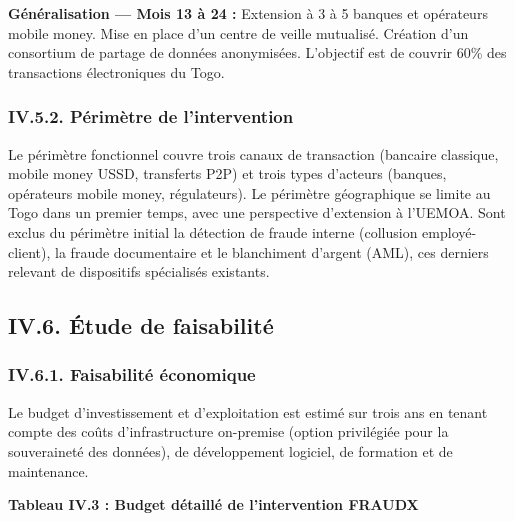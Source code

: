 \documentclass[
  12pt,
]{article}
\begin{document}
\textbf{Généralisation — Mois 13 à 24 :} Extension à 3 à 5 banques et
opérateurs mobile money. Mise en place d’un centre de veille mutualisé.
Création d’un consortium de partage de données anonymisées. L’objectif
est de couvrir 60\% des transactions électroniques du Togo.

\subsubsection{IV.5.2. Périmètre de
l’intervention}\label{iv.5.2.-puxe9rimuxe8tre-de-lintervention}

Le périmètre fonctionnel couvre trois canaux de transaction (bancaire
classique, mobile money USSD, transferts P2P) et trois types d’acteurs
(banques, opérateurs mobile money, régulateurs). Le périmètre
géographique se limite au Togo dans un premier temps, avec une
perspective d’extension à l’UEMOA. Sont exclus du périmètre initial la
détection de fraude interne (collusion employé-client), la fraude
documentaire et le blanchiment d’argent (AML), ces derniers relevant de
dispositifs spécialisés existants.

\subsection{IV.6. Étude de
faisabilité}\label{iv.6.-uxe9tude-de-faisabilituxe9}

\subsubsection{IV.6.1. Faisabilité
économique}\label{iv.6.1.-faisabilituxe9-uxe9conomique}

Le budget d’investissement et d’exploitation est estimé sur trois ans en
tenant compte des coûts d’infrastructure on-premise (option privilégiée
pour la souveraineté des données), de développement logiciel, de
formation et de maintenance.

\textbf{Tableau IV.3 : Budget détaillé de l’intervention FRAUDX}
\end{document}
